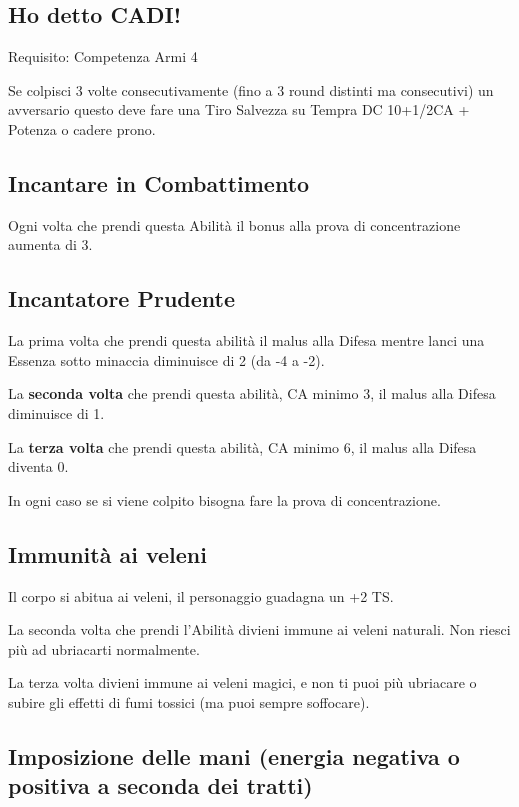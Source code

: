 \documentclass[a4paper,11pt,twoside,openany]{book}
\begin{document}
\subsection{Ho detto CADI!}

Requisito: Competenza Armi 4

Se colpisci 3 volte consecutivamente (fino a 3 round distinti ma consecutivi) un avversario questo deve fare una Tiro Salvezza su Tempra DC 10+1/2CA + Potenza o cadere prono.

\subsection{Incantare in Combattimento}

Ogni volta che prendi questa Abilità il bonus alla prova di concentrazione aumenta di 3.

\subsection{Incantatore Prudente}

La prima volta che prendi questa abilità il malus alla Difesa mentre lanci una Essenza sotto minaccia diminuisce di 2 (da -4 a -2).

La \textbf{seconda volta} che prendi questa abilità, CA minimo 3, il malus alla Difesa diminuisce di 1.

La \textbf{terza volta} che prendi questa abilità, CA minimo 6, il malus alla Difesa diventa 0.

In ogni caso se si viene colpito bisogna fare la prova di concentrazione.

\subsection{Immunità ai veleni}

Il corpo si abitua ai veleni, il personaggio guadagna un +2 TS.

La seconda volta che prendi l'Abilità divieni immune ai veleni naturali.
Non riesci più ad ubriacarti normalmente.

La terza volta divieni immune ai veleni magici, e non ti puoi più ubriacare o subire gli effetti di fumi tossici (ma puoi sempre soffocare).

\subsection{Imposizione delle mani (energia negativa o positiva a seconda dei tratti)}
\end{document}
